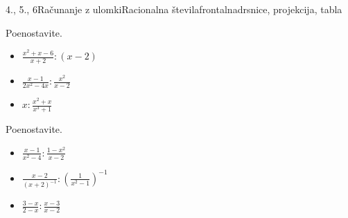 \begin{priprava}{4., 5., 6}{}{Računanje z ulomki}{Racionalna števila}{frontalna}{drsnice, projekcija, tabla}
\begin{multicols}{2}
\begin{naloga}
\begin{multicols}{2}
\begin{itemize}
        \end{itemize}
    \end{multicols}
    \end{naloga}




    \begin{naloga}
        Poenostavite.
        \begin{itemize}
            \item $\frac{x^2+x-6}{x+2}:(x-2)$ 
            \item $\frac{x-1}{2x^2-4x}:\frac{x^2}{x-2}$ 
            \item $x:\frac{x^2+x}{x^3+1}$ 
        \end{itemize}
    \end{naloga}



    \begin{naloga}
        Poenostavite.
        \begin{itemize}
            \item $\frac{x-1}{x^2-4}:\frac{1-x^2}{x-2}$ 
            \item $\frac{x-2}{(x+2)^{-1}}:\left(\frac{1}{x^2-1}\right)^{-1}$ 
            \item $\frac{3-x}{2-x}:\frac{x-3}{x-2}$ 
        \end{itemize}
    \end{naloga}

    ~
\end{multicols}


\end{priprava}